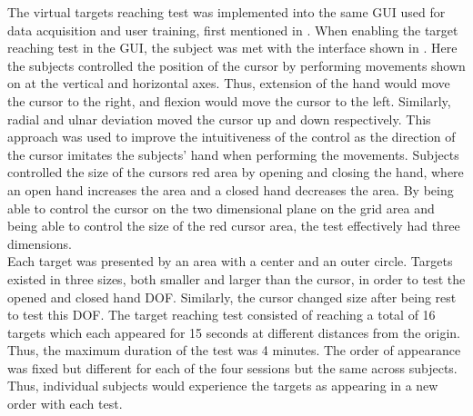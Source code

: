 The virtual targets reaching test was implemented into the same GUI used for data acquisition and user training, first mentioned in . 
When enabling the target reaching test in the GUI, the subject was met with the interface shown in . Here the subjects controlled the position of the cursor by performing movements shown on at the vertical and horizontal axes. Thus, extension of the hand would move the cursor to the right, and flexion would move the cursor to the left. Similarly, radial and ulnar deviation moved the cursor up and down respectively. This approach was used to improve the intuitiveness of the control as the direction of the cursor imitates the subjects' hand when performing the movements.
Subjects controlled the size of the cursors red area by opening and closing the hand, where an open hand increases the area and a closed hand decreases the area. By being able to control the cursor on the two dimensional plane on the grid area and being able to control the size of the red cursor area, the test effectively had three dimensions. \\
Each target was presented by an area with a center and an outer circle. Targets existed in three sizes, both smaller and larger than the cursor, in order to test the opened and closed hand DOF. Similarly, the cursor changed size after being rest to test this DOF. The target reaching test consisted of reaching a total of 16 targets which each appeared for 15 seconds at different distances from the origin. Thus, the maximum duration of the test was 4 minutes. The order of appearance was fixed but different for each of the four sessions but the same across subjects. Thus, individual subjects would experience the targets as appearing in a new order with each test. 


